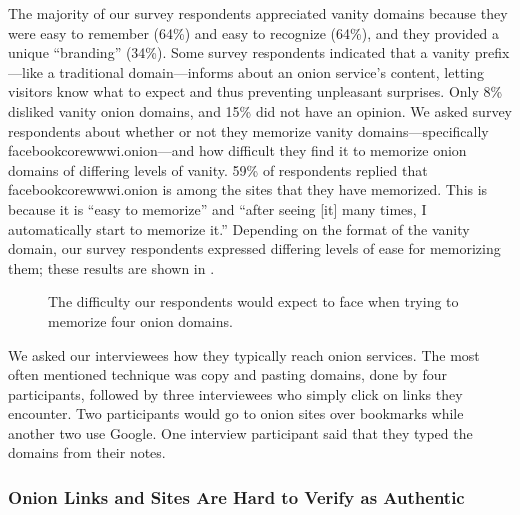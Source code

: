 The majority of our survey respondents appreciated vanity domains because they
were easy to remember (64\%) and easy to recognize (64\%), and they provided a
unique ``branding'' (34\%).  Some survey respondents indicated that a vanity
prefix---like a traditional domain---informs about an onion service's content,
letting visitors know what to expect and thus preventing unpleasant surprises.
Only 8\% disliked vanity onion domains, and 15\% did not have an opinion.  We
asked survey respondents about whether or not they memorize vanity
domains---specifically facebookcorewwwi.onion---and how difficult they find it
to memorize onion domains of differing levels of vanity.  59\% of respondents
replied that facebookcorewwwi.onion is among the sites that they have memorized.
This is 
because it is ``easy to memorize'' and ``after seeing [it] many times, I
automatically start to memorize it.'' Depending on the format of the vanity
domain, our survey respondents expressed differing levels of ease for memorizing
them; these results are shown in .

\begin{figure}[t]
    \centering
    
    \caption{The difficulty our respondents would expect to face when trying to
    memorize four onion domains.}
    \label{fig:memorize-domains}
\end{figure}

We asked our interviewees how they typically reach onion services.  The most
often mentioned technique was copy and pasting domains, done by four
participants, followed by three interviewees who simply click on links they
encounter.  Two participants would go to onion sites over bookmarks while
another two use Google.  One interview participant said that they typed the
domains from their notes.

\subsubsection{Onion Links and Sites Are Hard to Verify as Authentic}

